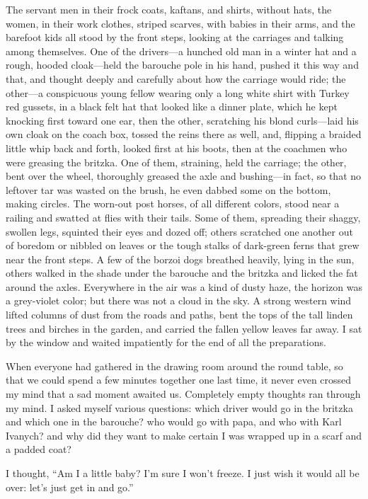 The servant men in their frock coats, kaftans, and shirts, without hats, the women, in their work clothes, striped scarves, with babies in their arms, and the barefoot kids all stood by the front steps, looking at the carriages and talking among themselves. One of the drivers---a hunched old man in a winter hat and a rough, hooded cloak---held the barouche pole in his hand, pushed it this way and that, and thought deeply and carefully about how the carriage would ride; the other---a conspicuous young fellow wearing only a long white shirt with Turkey red gussets, in a black felt hat that looked like a dinner plate, which he kept knocking first toward one ear, then the other, scratching his blond curls---laid his own cloak on the coach box, tossed the reins there as well, and, flipping a braided little whip back and forth, looked first at his boots, then at the coachmen who were greasing the britzka. One of them, straining, held the carriage; the other, bent over the wheel, thoroughly greased the axle and bushing---in fact, so that no leftover tar was wasted on the brush, he even dabbed some on the bottom, making circles. The worn-out post horses, of all different colors, stood near a railing and swatted at flies with their tails. Some of them, spreading their shaggy, swollen legs, squinted their eyes and dozed off; others scratched one another out of boredom or nibbled on leaves or the tough stalks of dark-green ferns that grew near the front steps. A few of the borzoi dogs breathed heavily, lying in the sun, others walked in the shade under the barouche and the britzka and licked the fat around the axles. Everywhere in the air was a kind of dusty haze, the horizon was a grey-violet color; but there was not a cloud in the sky. A strong western wind lifted columns of dust from the roads and paths, bent the tops of the tall linden trees and birches in the garden, and carried the fallen yellow leaves far away. I sat by the window and waited impatiently for the end of all the preparations.

When everyone had gathered in the drawing room around the round table, so that we could spend a few minutes together one last time, it never even crossed my mind that a sad moment awaited us. Completely empty thoughts ran through my mind. I asked myself various questions: which driver would go in the britzka and which one in the barouche? who would go with papa, and who with Karl Ivanych? and why did they want to make certain I was wrapped up in a scarf and a padded coat?

I thought, ``Am I a little baby? I'm sure I won't freeze. I just wish it would all be over: let's just get in and go.'' %

